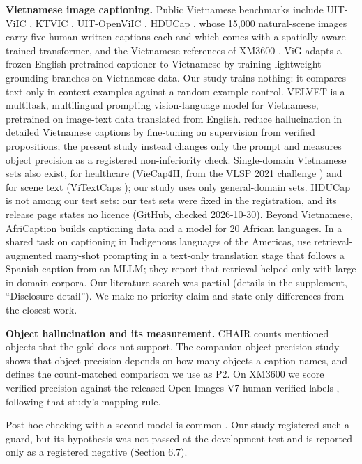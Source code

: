 \documentclass[manuscript,screen]{acmart}
\begin{document}
\textbf{Vietnamese image captioning.} Public Vietnamese benchmarks include UIT-ViIC
\citep{Lam2020UITViIC}, KTVIC \citep{Pham2024KTVIC}, UIT-OpenViIC
\citep{Bui2023OpenViIC, Bui2026OpenViICJournal}, HDUCap \citep{Hoang2026HDUCap}, whose 15,000
natural-scene images carry five human-written captions each and which comes with a spatially-aware
trained transformer, and the Vietnamese references of XM3600 \citep{Thapliyal2022XM3600}. ViG
\citep{Vu2026ViG} adapts a frozen English-pretrained captioner to Vietnamese by training lightweight
grounding branches on Vietnamese data. Our study trains nothing: it compares text-only in-context
examples against a random-example control. VELVET \citep{Vu2025VELVET} is a multitask, multilingual
prompting vision-language model for Vietnamese, pretrained on image-text data translated from
English. \citet{Nguyen2026FAIR} reduce hallucination in detailed Vietnamese captions by fine-tuning
on supervision from verified propositions; the present study instead changes only the prompt and
measures object precision as a registered non-inferiority check. Single-domain Vietnamese sets also
exist, for healthcare (VieCap4H, from the VLSP 2021 challenge \citep{Nguyen2022VieCap4H}) and for
scene text (ViTextCaps \citep{Nguyen2026ViTextCaps}); our study uses only general-domain sets.
HDUCap is not among our test sets: our test sets were fixed in the registration, and its release
page states no licence (GitHub, checked 2026-10-30). Beyond Vietnamese, AfriCaption
\citep{Oduwole2025AfriCaption} builds captioning data and a model for 20 African languages. In a
shared task on captioning in Indigenous languages of the Americas, \citet{Dhawan2026Gators} use
retrieval-augmented many-shot prompting in a text-only translation stage that follows a Spanish
caption from an MLLM; they report that retrieval helped only with large in-domain corpora. Our
literature search was partial (details in the supplement, ``Disclosure detail''). We make no
priority claim and state only differences from the closest work.

\textbf{Object hallucination and its measurement.} CHAIR \citep{Rohrbach2018CHAIR} counts mentioned
objects that the gold does not support. The companion object-precision study shows that object
precision depends on how many objects a caption names, and defines the count-matched comparison we
use as P2. On XM3600 we score verified precision against the released Open Images V7 human-verified
labels \citep{Kuznetsova2020OpenImages}, following that study's mapping rule.

Post-hoc checking with a second model is common \citep{Yin2023Woodpecker}. Our study registered such
a guard, but its hypothesis was not passed at the development test and is reported only as a
registered negative (Section 6.7).
\end{document}
